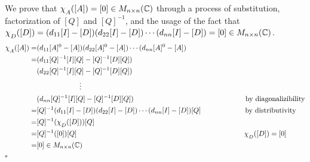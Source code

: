 \documentclass[12pt, letterpaper]{article}
\newcommand{\C}{\mathbb{C}}
\begin{document}
We prove that $\chi_{\raisebox{-.5ex}{$\scriptstyle A$}}([A]) = [0] \in M_{n \times n}(\C)$ through a process of substitution, factorization of $[Q]$ and $[Q]^{-1}$, and the usage of the fact that $\chi_{\raisebox{-.5ex}{$\scriptstyle D$}}([D]) = (d_{11}[I] - [D])(d_{22}[I] - [D])\cdots(d_{nn}[I] - [D]) = [0] \in M_{n \times n}(\C)$.
\begin{align*}
	\chi_{\raisebox{-.5ex}{$\scriptstyle A$}}([A]) 
	=& (d_{11}[A]^0 - [A])(d_{22}[A]^0 - [A]) \cdots (d_{nn}[A]^0 - [A]) \\
	=& (d_{11}[Q]^{-1}[I][Q] - [Q]^{-1}[D][Q]) \\ &(d_{22}[Q]^{-1}[I][Q] - [Q]^{-1}[D][Q]) \\ &\hspace{6em}\vdots \\ &(d_{nn}[Q]^{-1}[I][Q] - [Q]^{-1}[D][Q])  \hspace{15.7em} \text{by diagonalizibility}\\
	=& [Q]^{-1}(d_{11}[I] - [D])(d_{22}[I] - [D])\cdots(d_{nn}[I] - [D])[Q]  \hspace{6.2em} \text{by distributivity} \\
	=& [Q]^{-1}(\chi_{\raisebox{-.5ex}{$\scriptstyle D$}}([D]))[Q] \\
	=& [Q]^{-1}([0])[Q] \hspace{23.5em} \text{$\chi_{\raisebox{-.5ex}{$\scriptstyle D$}}([D]) = [0]$} \\
	=& [0] \in M_{n \times n}(\C)
\end{align*}
$\square$
\end{document}
